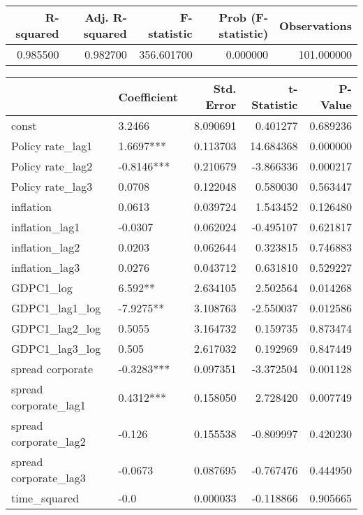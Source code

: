 \begin{tabular}{rrrrr}
\toprule
\textbf{R-squared} & \textbf{Adj. R-squared} & \textbf{F-statistic} & \textbf{Prob (F-statistic)} & \textbf{Observations} \\
\midrule
0.985500 & 0.982700 & 356.601700 & 0.000000 & 101.000000 \\
\bottomrule
\end{tabular}

\begin{tabular}{llrrr}
\toprule
 & \textbf{Coefficient} & \textbf{Std. Error} & \textbf{t-Statistic} & \textbf{P-Value} \\
\midrule
const & 3.2466 & 8.090691 & 0.401277 & 0.689236 \\
Policy rate_lag1 & 1.6697*** & 0.113703 & 14.684368 & 0.000000 \\
Policy rate_lag2 & -0.8146*** & 0.210679 & -3.866336 & 0.000217 \\
Policy rate_lag3 & 0.0708 & 0.122048 & 0.580030 & 0.563447 \\
inflation & 0.0613 & 0.039724 & 1.543452 & 0.126480 \\
inflation_lag1 & -0.0307 & 0.062024 & -0.495107 & 0.621817 \\
inflation_lag2 & 0.0203 & 0.062644 & 0.323815 & 0.746883 \\
inflation_lag3 & 0.0276 & 0.043712 & 0.631810 & 0.529227 \\
GDPC1_log & 6.592** & 2.634105 & 2.502564 & 0.014268 \\
GDPC1_lag1_log & -7.9275** & 3.108763 & -2.550037 & 0.012586 \\
GDPC1_lag2_log & 0.5055 & 3.164732 & 0.159735 & 0.873474 \\
GDPC1_lag3_log & 0.505 & 2.617032 & 0.192969 & 0.847449 \\
spread corporate & -0.3283*** & 0.097351 & -3.372504 & 0.001128 \\
spread corporate_lag1 & 0.4312*** & 0.158050 & 2.728420 & 0.007749 \\
spread corporate_lag2 & -0.126 & 0.155538 & -0.809997 & 0.420230 \\
spread corporate_lag3 & -0.0673 & 0.087695 & -0.767476 & 0.444950 \\
time_squared & -0.0 & 0.000033 & -0.118866 & 0.905665 \\
\bottomrule
\end{tabular}
